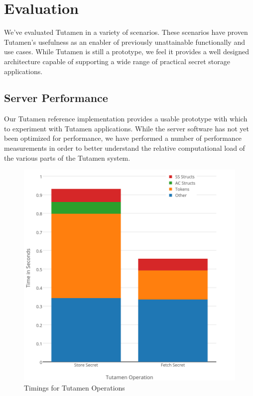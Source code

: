 \section{Evaluation}
\label{sec:eval}

We've evaluated Tutamen in a variety of scenarios. These scenarios
have proven Tutamen's usefulness as an enabler of previously
unattainable functionally and use cases. While Tutamen is still a
prototype, we feel it provides a well designed architecture capable of
supporting a wide range of practical secret storage applications.

\subsection{Server Performance}

Our Tutamen reference implementation provides a usable prototype with
which to experiment with Tutamen applications. While the server
software has not yet been optimized for performance, we have performed
a number of performance measurements in order to better understand the
relative computational load of the various parts of the Tutamen system.

\begin{figure}[th]
  \centering
  \includegraphics[width=\columnwidth]{./figs/png/chart-combined-timings.png}
  \caption{Timings for Tutamen Operations}
  \label{fig:eval:timings}
\end{figure}

